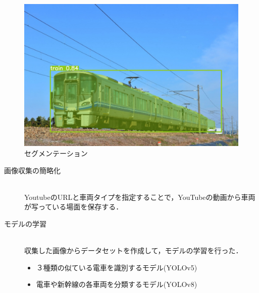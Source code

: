 \begin{figure}
		\begin{center}
			\includegraphics[width=200mm]{fig/521_seg.png}
		\end{center}
		\caption{セグメンテーション}
		\label{fig:three}
\end{figure}






\begin{description}
	\item[画像収集の簡略化] ~\\
	YoutubeのURLと車両タイプを指定することで，YouTubeの動画から車両が写っている場面を保存する．
	\href{run:./fig/demo.mp4}{\textcolor[hsb]{0.0, 0.7, 1.0}{\faPlayCircle[regular]}}
	
	\item[モデルの学習]~\\
	収集した画像からデータセットを作成して，モデルの学習を行った．
	\begin{itemize}
		\item ３種類の似ている電車を識別するモデル(YOLOv5)
		\item 電車や新幹線の各車両を分類するモデル(YOLOv8)
	\end{itemize}
\end{description}
\newpage


